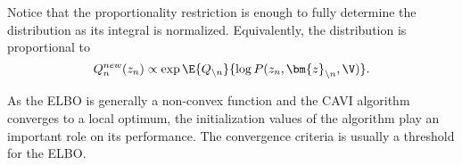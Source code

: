 Notice that the proportionality restriction is enough to fully determine the distribution as its integral is normalized. Equivalently, the distribution is proportional to
\[
    Q_{n}^{new}(z_{n}) \propto \exp{\E{Q_{\backslash n}}{\log{P(z_{n}, \bm{z}_{\backslash n}, \V)}}}.
\]

As the ELBO is generally a non-convex function and the CAVI algorithm converges to a local optimum, the initialization values of the algorithm play an important role on its performance.
The convergence criteria is usually a threshold for the ELBO.
